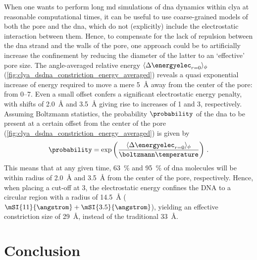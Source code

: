 
When one wants to perform long \gls{md} simulations of \gls{dna} dynamics within \gls{clya} at reasonable
computational times, it can be useful to use coarse-grained models of both the pore and the \gls{dna},
which do not (explicitly) include the electrostatic interaction between them. Hence, to compensate for the
lack of repulsion between the \gls{dna} strand and the walls of the pore, one approach could be to
artificially increase the confinement by reducing the diameter of the latter to an `effective' pore size.
The angle-averaged relative energy $\langle \Delta \energyelec_{r=0} \rangle_{\phi}$
(\cref{fig:clya_dsdna_constriction_energy_averaged}) reveals a quasi exponential increase of energy required to
move a mere \SI{5}{\angstrom} away from the center of the pore: from \SIrange{0}{7}{\kT}. Even a small offset confers a
significant electrostatic energy penalty, with shifts of \SI{2.0}{\angstrom} and \SI{3.5}{\angstrom} giving
rise to increases of \SI{1}{\kT} and \SI{3}{\kT}, respectively. Assuming Boltzmann statistics, the probability
$\probability$ of the \gls{dna} to be present at a certain offset from the center of the pore
(\cref{fig:clya_dsdna_constriction_energy_averaged}) is given by 
%
\begin{align}\label{eq:electrostatics_probability}
  \probability = \exp{
    \left( \dfrac{\langle \Delta \energyelec_{r=0} \rangle_{\phi}}{\boltzmann\temperature} \right)
    }
    \text{  .}
\end{align}
%
This means that at any given time, \SI{63}{\percent} and \SI{95}{\percent} of \gls{dna} molecules will be
within radius of \SI{2.0}{\angstrom} and \SI{3.5}{\angstrom} from the center of the pore, respectively. Hence,
when placing a cut-off at \SI{3}{\kT}, the electrostatic energy confines the DNA to a circular region with a
radius of \SI{14.5}{\angstrom} ($\mSI{11}{\angstrom} + \mSI{3.5}{\angstrom}$), yielding an effective
constriction size of \SI{29}{\angstrom}, instead of the traditional \SI{33}{\angstrom}.


\section{Conclusion}
%
\label{sec:elec:conclusion}
%

